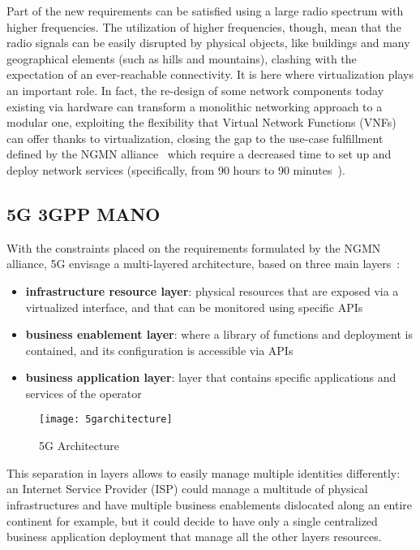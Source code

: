 Part of the new requirements can be satisfied using a large radio spectrum with
higher frequencies. The utilization of higher frequencies, though, mean that the
radio signals can be easily disrupted by physical objects, like buildings and
many geographical elements (such as hills and mountains), clashing with the
expectation of an ever-reachable connectivity. It is here where virtualization
plays an important role. In fact, the re-design of some network components today
existing via hardware can transform a monolithic networking approach to a
modular one, exploiting the flexibility that Virtual Network Functions
(VNFs)~\cite{moens2014vnf} can offer thanks to virtualization, closing the gap
to the use-case fulfillment defined by the NGMN alliance~\cite{iwamura2015ngmn}
which require a decreased time to set up and deploy network services
(specifically, from 90 hours to 90 minutes~\cite{networld20202014role}).

\subsection{5G 3GPP MANO}

With the constraints placed on the requirements formulated by the NGMN alliance,
5G envisage a multi-layered architecture, based on three main
layers~\cite{alliance20155g}:
\begin{itemize}
\item \textbf{infrastructure resource layer}: physical resources that are 
exposed via a virtualized interface, and that can be monitored using specific 
APIs
\item \textbf{business enablement layer}: where a library of functions and
  deployment is contained, and its configuration is accessible via APIs
\item \textbf{business application layer}: layer that contains specific
  applications and services of the operator
\end{itemize}

\begin{figure}[t]
  \centering
  \texttt{[image: 5garchitecture]}
  \caption[5G Architecture]{5G Architecture~\cite{alliance20155g}}
  \label{chap:background:img:5garchitecture}
\end{figure}

This separation in layers allows to easily manage multiple identities 
differently: an Internet Service Provider (ISP) could manage a multitude of 
physical infrastructures and have multiple business enablements dislocated 
along an entire continent for example, but it could decide to have only a 
single centralized business application deployment that manage all the other 
layers resources.

